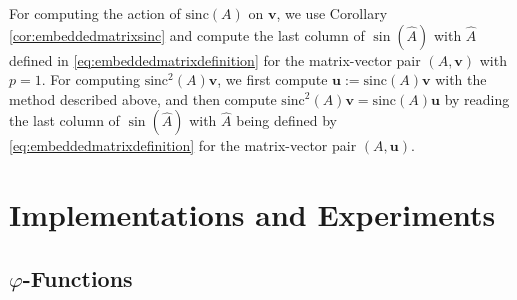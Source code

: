 For computing the action of $\mathrm{sinc}(A)$ on $\mathbf{v}$, we use Corollary
\ref{cor:embeddedmatrixsinc} and compute the last column of $\sin(\hat{A})$ with
$\hat{A}$ defined in \eqref{eq:embeddedmatrixdefinition} for the matrix-vector
pair $(A, \mathbf{v})$ with $p=1$. For computing $\mathrm{sinc}^2(A) \mathbf{v}$, we
first compute $\mathbf{u} := \mathrm{sinc}(A)\mathbf{v}$ with the method described above, and then
compute $\mathrm{sinc}^2(A) \mathbf{v} = \mathrm{sinc}(A) \mathbf{u}$ by reading the last column
of $\sin(\hat{A})$ with $\hat{A}$ being defined by
\eqref{eq:embeddedmatrixdefinition} for the matrix-vector pair $(A, \mathbf{u})$.

\FloatBarrier

\section{Implementations and Experiments}
\label{sec:experiments}

\subsection{\texorpdfstring{$\varphi$}{Phi}-Functions}
\label{sec:resultsphifunctions}

